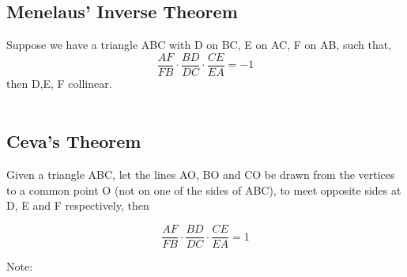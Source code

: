 \documentclass{article}
\begin{document}
\subsection{Menelaus' Inverse Theorem}

Suppose we have a triangle ABC with D on BC, E on AC, F on AB, such that,
$$\frac{AF}{FB}\cdot \frac{BD}{DC} \cdot \frac{CE}{EA}=-1$$
then D,E, F collinear.\\\\


\pagebreak

\subsection{Ceva's Theorem}
Given a triangle ABC, let the lines AO, BO and CO be drawn from the vertices to a common point O (not on one of the sides of ABC), to meet opposite sides at D, E and F respectively, then

$$\frac{AF}{FB}\cdot \frac{BD}{DC} \cdot \frac{CE}{EA}=1$$





Note:\\
\end{document}
